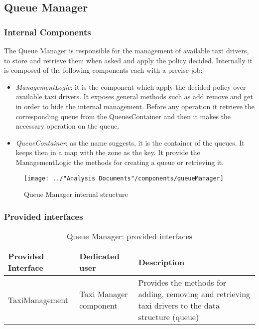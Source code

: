 \subsection{Queue Manager}\label{comp:queueManager}
\subsubsection{Internal Components}
The Queue Manager is responsible for the management of available taxi drivers, to store and retrieve them when asked and apply the policy decided. Internally it is composed of the following components each with a precise job:
\begin{itemize}
	\item \textit{ManagementLogic}: it is the component which apply the decided policy over available taxi drivers. It exposes general methods such as add remove and get in order to hide the internal management. Before any operation it retrieve the corresponding queue from the QueuesContainer and then it makes the necessary operation on the queue.
	\item \textit{QueueContainer}: as the name suggests, it is the container of the queues. It keeps then in a map with the zone as the key. It provide the ManagementLogic the methods for creating a queue or retrieving it.
\end{itemize}
\begin{figure}[H]
	\centering
	\texttt{[image: ../"Analysis Documents"/components/queueManager]}
	\label{fig:queuemanager}
	\caption{Queue Manager internal structure}
\end{figure}
\subsubsection{Provided interfaces}
\begin{table}[H]
	\begin{longtable}{| p{} | p{} | p{} |}
		\hline
		\textbf{Provided Interface} & \textbf{Dedicated user} & \textbf{Description} \\ \hline
		TaxiManagement & Taxi Manager component & Provides the methods for adding, removing and retrieving taxi drivers to the data structure (queue) \\ \hline
	\end{longtable}
	\caption{Queue Manager: provided interfaces}
	\label{tab:queuemanager:providedInterfaces}
\end{table}
